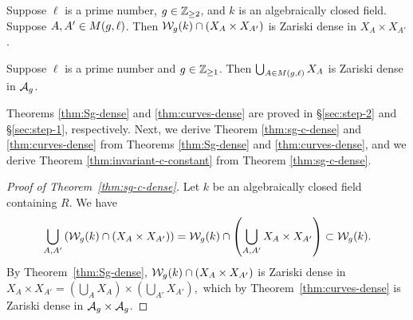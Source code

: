 \documentclass{amsart}
\begin{document}
\begin{theorem}\label{thm:Sg-dense}
  Suppose $\ell$ is a prime number, $g\in\mathbb{Z}_{\ge 2}$, and $k$ is an algebraically closed field. Suppose $A,A' \in M(g,\ell)$. Then $\mathcal{W}_g(k) \cap (X_A \times X_{A'})$ is Zariski dense in $X_A \times X_{A'}$.
\end{theorem}

\begin{theorem}\label{thm:curves-dense}
    Suppose $\ell$ is a prime number and $g\in\mathbb{Z}_{\ge 1}$. Then $\bigcup_{A \in M(g,\ell)} X_A$ is Zariski dense in $\mathcal{A}_g$.
\end{theorem}

Theorems \ref{thm:Sg-dense} and \ref{thm:curves-dense} are proved in \S\ref{sec:step-2} and \S\ref{sec:step-1}, respectively. Next, we derive Theorem \ref{thm:sg-c-dense} and \ref{thm:curves-dense} from Theorems \ref{thm:Sg-dense} and \ref{thm:curves-dense}, and we derive Theorem \ref{thm:invariant-c-constant} from Theorem \ref{thm:sg-c-dense}.

\begin{proof}[Proof of Theorem~\ref{thm:sg-c-dense}]
Let $k$ be an algebraically closed field containing $R$. We have
$$
\bigcup_{A,A'} \left(\mathcal{W}_g(k) \cap (X_A \times X_{A'})\right) =  \mathcal{W}_g(k) \cap \left(\bigcup_{A,A'} X_A \times X_{A'}\right)
   \subset \mathcal{W}_g(k).
   $$
By Theorem~\ref{thm:Sg-dense},
$\mathcal{W}_g(k) \cap (X_A \times X_{A'})$ is Zariski dense in $X_A \times X_{A'} =
    \left(\bigcup_{A} X_A\right) \times \left(\bigcup_{A'} X_{A'}\right),$ which by Theorem~\ref{thm:curves-dense} is Zariski dense in $\mathcal{A}_g \times \mathcal{A}_g$.
\end{proof}
\end{document}
